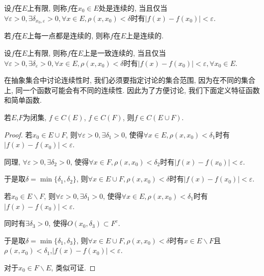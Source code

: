 \documentclass[theorem=false,mathfont=none,openany,sub3section]{easybook}
\begin{document}
\begin{definition}
  设$f$在$E$上有限, 则称$f$在$x_0\in E$处是连续的, 当且仅当$ \forall \varepsilon >0, \exists \delta_{x_0,\varepsilon} >0, \forall x\in E, \rho(x,x_0)<\delta$时有$ |f(x)-f(x_0)|<\varepsilon$.\par
  若$f$在$E$上每一点都是连续的, 则称$f$在$E$上是连续的.\par
  设$f$在$E$上有限, 则称$f$在$E$上是一致连续的, 当且仅当$ \forall \varepsilon >0, \exists \delta_{\varepsilon} >0, \forall x\in E, \rho(x,x_0)<\delta$时有$ |f(x)-f(x_0)|<\varepsilon, \forall x_0 \in E$.\par
\end{definition}

\begin{remark}
  在抽象集合中讨论连续性时, 我们必须要指定讨论的集合范围, 因为在不同的集合上, 同一个函数可能会有不同的连续性. 因此为了方便讨论, 我们下面定义特征函数和简单函数.\par
\end{remark}

\begin{theorem}
  若$E$,$F$为闭集, $f\in C(E)$, $f\in C(F)$, 则$f\in C(E \cup F)$.\par
\end{theorem}

\begin{proof}
  若$x_0\in E\cup F$, 则$\forall \varepsilon >0, \exists \delta_{1} >0$, 使得$\forall x\in E, \rho(x,x_0)<\delta_{1}$时有$|f(x)-f(x_0)|<\varepsilon$.\par
  同理, $\forall \varepsilon >0, \exists \delta_{2} >0$, 使得$\forall x\in F, \rho(x,x_0)<\delta_{2}$时有$|f(x)-f(x_0)|<\varepsilon$.\par
  于是取$\delta = \min\{\delta_{1},\delta_{2}\}$, 则$\forall x\in E\cup F, \rho(x,x_0)<\delta$时有$|f(x)-f(x_0)|<\varepsilon$.\par
  若$x_0\in E\backslash F$, 则$\forall \varepsilon >0, \exists \delta_{1} >0$, 使得$\forall x\in E, \rho(x,x_0)<\delta_{1}$时有$|f(x)-f(x_0)|<\varepsilon$.\par
  同时有$\exists \delta_{3} >0$, 使得$O(x_0,\delta_{3})\subset F^c$.\par
  于是取$\delta = \min\{\delta_{1},\delta_{3}\}$, 则$\forall x\in E\cup F, \rho(x,x_0)<\delta$时有$x\in E\backslash F$且$\rho(x,x_0)<\delta_{1}$,$|f(x)-f(x_0)|<\varepsilon$.\par
  对于$x_0\in F\backslash E$, 类似可证.\par
\end{proof}
\end{document}
